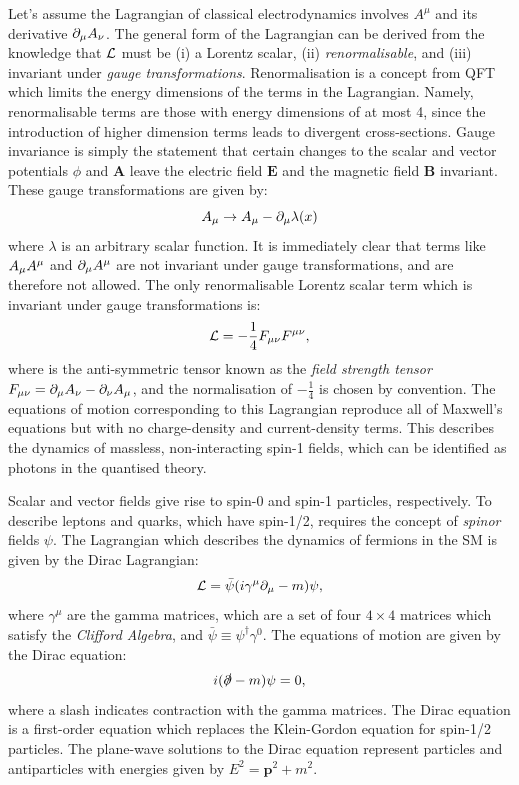 Let's assume the Lagrangian of classical electrodynamics involves $A^\mu$ and its derivative $\partial_\mu A_\nu$. The general form of the Lagrangian can be derived from the knowledge that $\mathcal{L}$ must be (i) a Lorentz scalar, (ii) \textit{renormalisable}, and (iii) invariant under \textit{gauge transformations}. Renormalisation is a concept from QFT which limits the energy dimensions of the terms in the Lagrangian. Namely, renormalisable terms are those with energy dimensions of at most 4, since the introduction of higher dimension terms leads to divergent cross-sections. Gauge invariance is simply the statement that certain changes to the scalar and vector potentials $\phi$ and $\mathbf{A}$ leave the electric field $\mathbf{E}$ and the magnetic field $\mathbf{B}$ invariant. These gauge transformations are given by:
\begin{equation}
   A_\mu\rightarrow A_\mu-\partial_\mu\lambda(x)
\end{equation}
where $\lambda$ is an arbitrary scalar function. It is immediately clear that terms like $A_\mu A^\mu$ and $\partial_\mu A^\mu$ are not invariant under gauge transformations, and are therefore not allowed. The only renormalisable Lorentz scalar term which is invariant under gauge transformations is:
\begin{equation}\label{eq:maxwell}
    \mathcal{L}=-\frac{1}{4}F_{\mu\nu}F^{\mu\nu},
\end{equation}
where \fmunu is the anti-symmetric tensor known as the \textit{field strength tensor} $F_{\mu\nu}=\partial_\mu A_\nu-\partial_\nu A_\mu$, and the normalisation of $-\frac{1}{4}$ is chosen by convention. The equations of motion corresponding to this Lagrangian reproduce all of Maxwell's equations but with no charge-density and current-density terms. This describes the dynamics of massless, non-interacting spin-1 fields, which can be identified as photons in the quantised theory. 

Scalar and vector fields give rise to spin-0 and spin-1 particles, respectively. To describe leptons and quarks, which have spin-1/2, requires the concept of \textit{spinor} fields $\psi$. The Lagrangian which describes the dynamics of fermions in the SM is given by the Dirac Lagrangian:
\begin{equation}\label{eq:dirac}
    \mathcal{L}=\bar{\psi}(i\gamma^\mu\partial_\mu-m)\psi,
\end{equation}
where $\gamma^{\mu}$ are the gamma matrices, which are a set of four $4\times4$ matrices which satisfy the \textit{Clifford Algebra}, and $\bar{\psi}\equiv\psi^\dagger\gamma^0$. The equations of motion are given by the Dirac equation:
\begin{equation}
    i(\slashed{\partial}-m)\psi=0,
\end{equation}
where a slash indicates contraction with the gamma matrices. The Dirac equation is a first-order equation which replaces the Klein-Gordon equation for spin-1/2 particles. The plane-wave solutions to the Dirac equation represent particles and antiparticles with energies given by $E^2=\mathbf{p}^2+m^2$.

